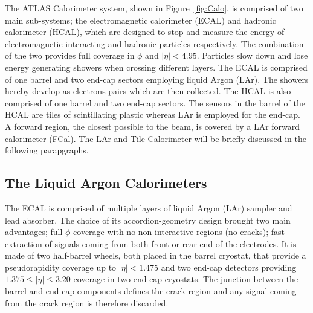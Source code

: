 			The ATLAS Calorimeter system, shown in Figure~\ref{fig:Calo}, is comprised of two main sub-systems; the electromagnetic calorimeter (ECAL) and hadronic calorimeter (HCAL), which are designed to stop and measure the energy of electromagnetic-interacting and hadronic particles respectively. The combination of the two provides full coverage in $\phi$ and $\left | \eta \right | < 4.95$. Particles slow down and lose energy generating showers when crossing different layers. The ECAL is comprised of one barrel and two end-cap sectors employing liquid Argon (LAr). The showers hereby develop as electrons pairs which are then collected. The HCAL is also comprised of one barrel and two end-cap sectors. The sensors in the barrel of the HCAL are tiles of scintillating plastic whereas LAr is employed for the end-cap. A forward region, the closest possible to the beam, is covered by a LAr forward calorimeter (FCal). The LAr and Tile Calorimeter will be briefly discussed in the following parapgraphs. 

			\subsection*{The Liquid Argon Calorimeters}

 				The ECAL is comprised of multiple layers of liquid Argon (LAr) sampler and lead absorber. The choice of its accordion-geometry design brought two main advantages; full $\phi$ coverage with no non-interactive regions (no cracks); fast extraction of signals coming from both front or rear end of the electrodes. It is made of two half-barrel wheels, both placed in the barrel cryostat, that provide a pseudorapidity coverage up to $\left | \eta\right | < 1.475$ and two end-cap detectors providing $1.375 \leq \left|\eta\right| \leq 3.20$ coverage in two end-cap cryostats. The junction between the barrel and end cap components defines the crack region and any signal coming from the crack region is therefore discarded. 

